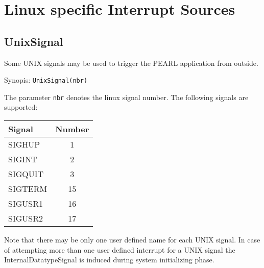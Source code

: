 \section{Linux specific Interrupt Sources}

\subsection{UnixSignal}
Some UNIX signals may be used to trigger the PEARL application from outside.

Synopis: \verb|UnixSignal(nbr)|

The parameter \verb|nbr| denotes the linux signal number.
The following signals are supported:

\begin{tabular}{|l|c|}
\hline
Signal & Number \\
\hline
SIGHUP & 1 \\
SIGINT & 2 \\
SIGQUIT & 3 \\
SIGTERM & 15 \\
SIGUSR1 & 16 \\
SIGUSR2 & 17 \\
\hline
\end{tabular}

Note that there may be only one user defined name for each UNIX signal.
In case of attempting more than one user defined interrupt for 
a UNIX signal the InternalDatatypeSignal is induced 
during system initializing phase.

